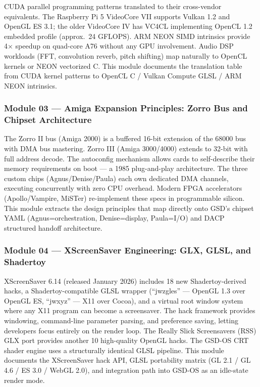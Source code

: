 \documentclass[11pt,letterpaper]{article}
\begin{document}
CUDA parallel programming patterns translated to their cross-vendor equivalents. The Raspberry Pi 5 VideoCore VII supports Vulkan 1.2 and OpenGL ES 3.1; the older VideoCore IV has VC4CL implementing OpenCL 1.2 embedded profile (approx.\ 24 GFLOPS). ARM NEON SIMD intrinsics provide 4× speedup on quad-core A76 without any GPU involvement. Audio DSP workloads (FFT, convolution reverb, pitch shifting) map naturally to OpenCL kernels or NEON vectorized C. This module documents the translation table from CUDA kernel patterns to OpenCL C / Vulkan Compute GLSL / ARM NEON intrinsics.

\subsubsection{Module 03 — Amiga Expansion Principles: Zorro Bus and Chipset Architecture}

The Zorro II bus (Amiga 2000) is a buffered 16-bit extension of the 68000 bus with DMA bus mastering. Zorro III (Amiga 3000/4000) extends to 32-bit with full address decode. The autoconfig mechanism allows cards to self-describe their memory requirements on boot — a 1985 plug-and-play architecture. The three custom chips (Agnus/Denise/Paula) each own dedicated DMA channels, executing concurrently with zero CPU overhead. Modern FPGA accelerators (Apollo/Vampire, MiSTer) re-implement these specs in programmable silicon. This module extracts the design principles that map directly onto GSD's chipset YAML (Agnus=orchestration, Denise=display, Paula=I/O) and DACP structured handoff architecture.

\subsubsection{Module 04 — XScreenSaver Engineering: GLX, GLSL, and Shadertoy}

XScreenSaver 6.14 (released January 2026) includes 18 new Shadertoy-derived hacks, a Shadertoy-compatible GLSL wrapper (``jwzgles'' — OpenGL 1.3 over OpenGL ES, ``jwxyz'' — X11 over Cocoa), and a virtual root window system where any X11 program can become a screensaver. The hack framework provides windowing, command-line parameter parsing, and preference saving, letting developers focus entirely on the render loop. The Really Slick Screensavers (RSS) GLX port provides another 10 high-quality OpenGL hacks. The GSD-OS CRT shader engine uses a structurally identical GLSL pipeline. This module documents the XScreenSaver hack API, GLSL portability matrix (GL 2.1 / GL 4.6 / ES 3.0 / WebGL 2.0), and integration path into GSD-OS as an idle-state render mode.
\end{document}
